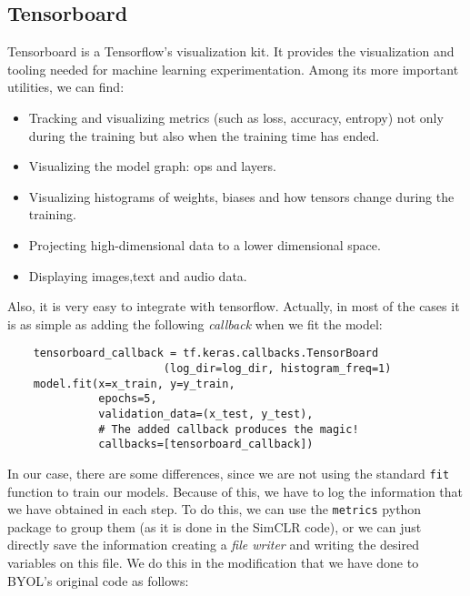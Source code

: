 \subsection{Tensorboard}

Tensorboard is a Tensorflow's visualization kit. It provides the visualization and tooling needed for machine learning experimentation. Among its more important utilities, we can find:
\begin{itemize}
\item Tracking and visualizing metrics (such as loss, accuracy, entropy) not only during the training but also when the training time has ended.

\item Visualizing the model graph: ops and layers.

\item Visualizing histograms of weights, biases and how tensors change during the training.

\item Projecting high-dimensional data to a lower dimensional space.

\item Displaying images,text and audio data.
\end{itemize}

Also, it is very easy to integrate with tensorflow.  Actually, in most of the cases it is as simple as adding the following \emph{callback} when we fit the model:

\begin{verbatim}
    tensorboard_callback = tf.keras.callbacks.TensorBoard
                        (log_dir=log_dir, histogram_freq=1)
    model.fit(x=x_train, y=y_train, 
              epochs=5, 
              validation_data=(x_test, y_test),
              # The added callback produces the magic! 
              callbacks=[tensorboard_callback])  
\end{verbatim}

In our case, there are some differences, since we are not using the standard \lstinline{fit} function to train our models. Because of this, we have to log the information that we have obtained in each step. To do this, we can use the \lstinline{metrics} python package to group them (as it is done in the SimCLR code), or we can just directly save the information creating a \emph{file writer} and writing the desired variables on this file. We do this in the modification that we have done to BYOL's original code as follows:

